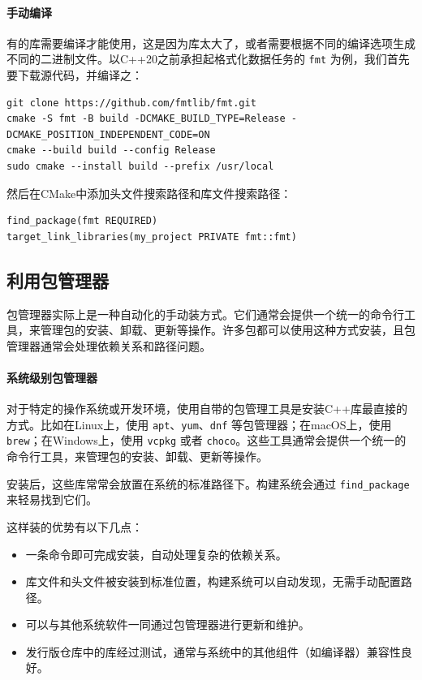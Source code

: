 \paragraph{手动编译} 有的库需要编译才能使用，这是因为库太大了，或者需要根据不同的编译选项生成不同的二进制文件。以C++20之前承担起格式化数据任务的 \verb|fmt| 为例，我们首先要下载源代码，并编译之：
\begin{verbatim}
git clone https://github.com/fmtlib/fmt.git
cmake -S fmt -B build -DCMAKE_BUILD_TYPE=Release -DCMAKE_POSITION_INDEPENDENT_CODE=ON
cmake --build build --config Release
sudo cmake --install build --prefix /usr/local
\end{verbatim}
然后在CMake中添加头文件搜索路径和库文件搜索路径：
\begin{verbatim}
find_package(fmt REQUIRED)
target_link_libraries(my_project PRIVATE fmt::fmt)
\end{verbatim}

\subsection{利用包管理器}

包管理器实际上是一种自动化的手动装方式。它们通常会提供一个统一的命令行工具，来管理包的安装、卸载、更新等操作。许多包都可以使用这种方式安装，且包管理器通常会处理依赖关系和路径问题。

\paragraph{系统级别包管理器} 对于特定的操作系统或开发环境，使用自带的包管理工具是安装C++库最直接的方式。比如在Linux上，使用 \verb|apt|、\verb|yum|、\verb|dnf| 等包管理器；在macOS上，使用 \verb|brew|；在Windows上，使用 \verb|vcpkg| 或者 \verb|choco|。这些工具通常会提供一个统一的命令行工具，来管理包的安装、卸载、更新等操作。

安装后，这些库常常会放置在系统的标准路径下。构建系统会通过 \verb|find_package| 来轻易找到它们。

这样装的优势有以下几点：
\begin{itemize}
    \item 一条命令即可完成安装，自动处理复杂的依赖关系。
    \item 库文件和头文件被安装到标准位置，构建系统可以自动发现，无需手动配置路径。
    \item 可以与其他系统软件一同通过包管理器进行更新和维护。
    \item 发行版仓库中的库经过测试，通常与系统中的其他组件（如编译器）兼容性良好。
\end{itemize}

